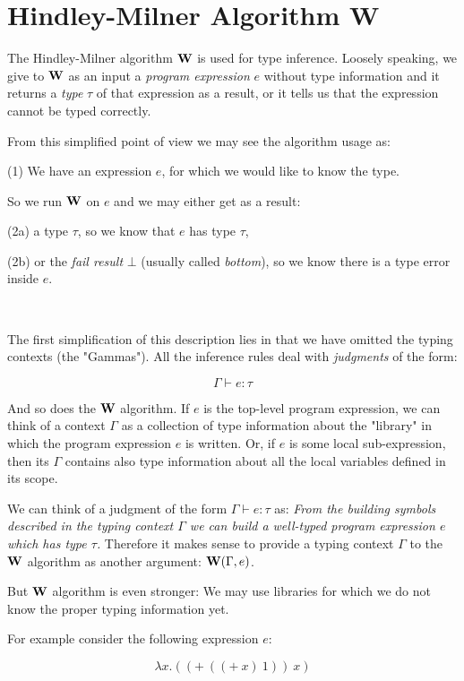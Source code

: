 \documentclass[a4paper,oneside]{memoir}
\begin{document}
\section{Hindley-Milner Algorithm W}

The Hindley-Milner algorithm $\operatorname{\textbf{W}}$ is used for type inference.
Loosely speaking, we give to $\operatorname{\textbf{W}}$ as an input 
a \textit{program expression} $e$ without type information 
and it returns a \textit{type} $\tau$ of that expression as a result, 
or it tells us that the expression cannot be typed correctly.

From this simplified point of view we may see the algorithm usage as:

(1) We have an expression $e$, for which we would like to know the type. 

So we run $\operatorname{\textbf{W}}$ on $e$ and we may either get as a result:

(2a) a type $\tau$, so we know that $e$ has type $\tau$,

(2b) or the \textit{fail result} $\bot$ (usually called \textit{bottom}), so we know there is a type error inside $e$.

~   

The first simplification of this description lies in that we have omitted 
the typing contexts (the "Gammas"). 
All the inference rules deal with \textit{judgments} of the form:

$$\Gamma \vdash e : \tau$$

And so does the $\operatorname{\textbf{W}}$ algorithm.
If $e$ is the top-level program expression,
we can think of a context $\Gamma$ as a collection of type information about the "library"
in which the program expression $e$ is written.
Or, if $e$ is some local sub-expression, then its $\Gamma$ contains also type information about
all the local variables defined in its scope.

We can think of a judgment of the form $\Gamma \vdash e : \tau$ as: 
\textit{From the building symbols described in the typing context $\Gamma$ we can build 
a well-typed program expression $e$ which has type $\tau$.}
Therefore it makes sense to provide a typing context $\Gamma$ to the $\operatorname{\textbf{W}}$ algorithm as another argument: $\operatorname{\textbf{W}}(\Gamma, e)$.

But $\operatorname{\textbf{W}}$ algorithm is even stronger: We may use libraries for which we do not know the proper typing information yet.

For example consider the following expression $e$:

$$ \lambda x . ((+~((+~x)~1))~x) $$
\end{document}
